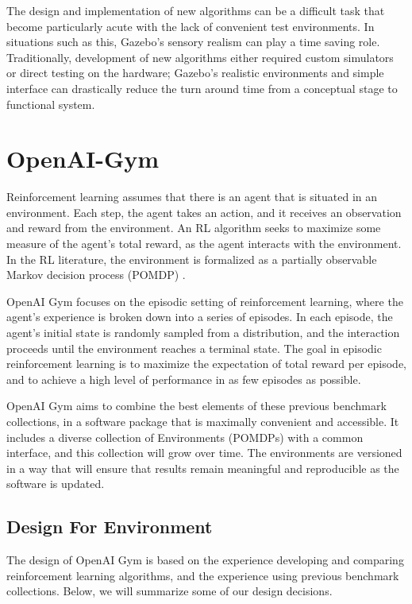 The design and implementation of new algorithms can be a difficult task that become particularly acute with the lack of convenient test environments. In situations such as this, Gazebo's sensory realism can play a time saving role. Traditionally, development of new algorithms either required custom simulators or direct testing on the hardware; Gazebo's realistic environments and simple interface can drastically reduce the turn around time from a conceptual stage to functional system.

\section{OpenAI-Gym}

Reinforcement learning assumes that there is an agent that is situated in an environment. Each step, the agent takes an action, and it receives an observation and reward from the environment. An RL algorithm seeks to maximize some measure of the agent's total reward, as the agent interacts with the environment. In the RL literature, the environment is formalized as a partially observable Markov decision process (POMDP) \cite{Sutton1998RL}.

OpenAI Gym focuses on the episodic setting of reinforcement learning, where the agent's experience is broken down into a series of episodes. In each episode, the agent's initial state is randomly sampled from a distribution, and the interaction proceeds until the environment reaches a terminal state. The goal in episodic reinforcement learning is to maximize the expectation of total reward per episode, and to achieve a high level of performance in as few episodes as possible.

OpenAI Gym aims to combine the best elements of these previous benchmark collections, in a software package that is maximally convenient and accessible. It includes a diverse collection of Environments (POMDPs) with a common interface, and this collection will grow over time. The environments are versioned in a way that will ensure that results remain meaningful and reproducible as the software is updated.

\subsection{Design For Environment}

The design of OpenAI Gym is based on the experience developing and comparing reinforcement learning algorithms, and the experience using previous benchmark collections. Below, we will summarize some of our design decisions.

